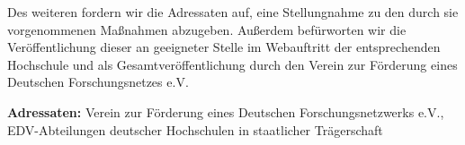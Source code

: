 \documentclass[aspectratio=43]{beamer}
\begin{document}
\begin{frame}
Des weiteren fordern wir die Adressaten auf, eine Stellungnahme zu den durch sie vorgenommenen Maßnahmen abzugeben. Außerdem befürworten wir die Veröffentlichung dieser an geeigneter Stelle im Webauftritt der entsprechenden Hochschule und als Gesamtveröffentlichung durch den Verein zur Förderung eines Deutschen Forschungsnetzes e.V.

\vspace{1cm}

\textbf{Adressaten:} Verein zur Förderung eines Deutschen Forschungsnetzwerks e.V., EDV-Abteilungen deutscher Hochschulen in staatlicher Trägerschaft

\end{frame}
\end{document}
